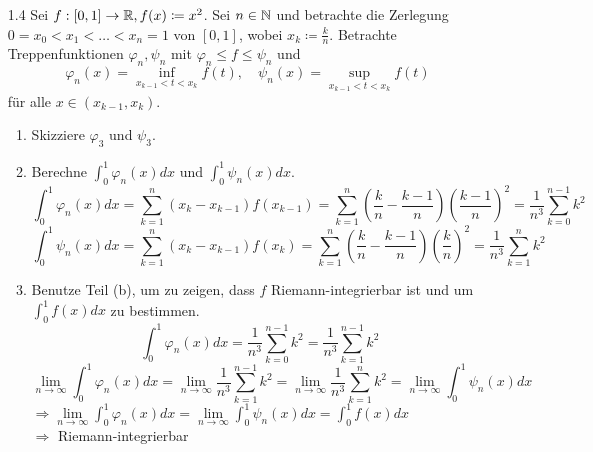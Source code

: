 \documentclass{HM}
\begin{document}
\begin{enumerate}
		 \newpage
		 \item[1.4] Sei $f:[0,1]\to\mathbb{R}, f(x)\coloneqq x^2$. Sei $n\in\mathbb{N}$ und betrachte die Zerlegung $0=x_0<x_1<\hdots<x_n=1$ von $[0,1]$, wobei $x_k\coloneqq\frac{k}{n}$. Betrachte Treppenfunktionen $\varphi_n,\psi_n$ mit $\varphi_n\leq f\leq\psi_n$ und
		 $$\varphi_n(x)=\inf\limits_{x_{k-1}<t<x_k}f(t),\quad \psi_n(x)=\sup\limits_{x_{k-1}<t<x_k}f(t)$$
		 für alle $x\in(x_{k-1}, x_k)$.
		 \begin{enumerate}
		 	\item Skizziere $\varphi_3$ und $\psi_3$.\\
		 	\item Berechne $\int_0^1\varphi_n(x)dx$ und $\int_0^1\psi_n(x)dx$.
		 	$$\int_0^1\varphi_n(x)dx=\sum\limits_{k=1}^n(x_k-x_{k-1})f(x_{k-1})=\sum\limits_{k=1}^n(\frac{k}{n}-\frac{k-1}{n})\left(\frac{k-1}{n}\right)^2=\frac{1}{n^3}\sum\limits_{k=0}^{n-1}k^2$$
		 	$$\int_0^1\psi_n(x)dx=\sum\limits_{k=1}^n(x_k-x_{k-1})f(x_{k})=\sum\limits_{k=1}^n(\frac{k}{n}-\frac{k-1}{n})\left(\frac{k}{n}\right)^2=\frac{1}{n^3}\sum\limits_{k=1}^nk^2$$
		 	\newpage
		 	\item Benutze Teil (b), um zu zeigen, dass $f$ Riemann-integrierbar ist und um $\int_0^1f(x)dx$ zu bestimmen.
		 	$$\int_0^1\varphi_n(x)dx=\frac{1}{n^3}\sum\limits_{k=0}^{n-1}k^2=\frac{1}{n^3}\sum\limits_{k=1}^{n-1}k^2$$
		 	$$\lim\limits_{n\to\infty}\int_0^1\varphi_n(x)dx=\lim\limits_{n\to\infty}\frac{1}{n^3}\sum\limits_{k=1}^{n-1}k^2=\lim\limits_{n\to\infty}\frac{1}{n^3}\sum\limits_{k=1}^{n}k^2=\lim\limits_{n\to\infty}\int_0^1\psi_n(x)dx$$
		 	$\Rightarrow \lim\limits_{n\to\infty}\int_0^1\varphi_n(x)dx=\lim\limits_{n\to\infty}\int_0^1\psi_n(x)dx=\int_0^1f(x)dx$\\
		 	$\Rightarrow$ Riemann-integrierbar
		 	\begin{align*}

\end{align*}
\end{enumerate}
\end{enumerate}
\end{document}
